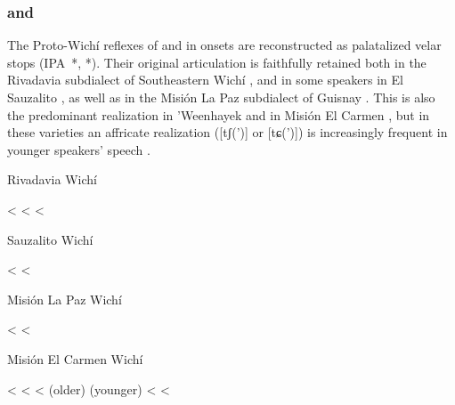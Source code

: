 \subsubsection{ and }

The Proto-Wichí reflexes of  and  in onsets are reconstructed as palatalized velar stops (IPA~*, *). Their original articulation is faithfully retained both in the Rivadavia subdialect of Southeastern Wichí , and in some speakers in El Sauzalito , as well as in the Misión La Paz subdialect of Guisnay . This is also the predominant realization in ’Weenhayek and in Misión El Carmen , but in these varieties an affricate realization ([tʃ(’)] or [tɕ(’)]) is increasingly frequent in younger speakers’ speech \citep[14]{KC94}.

\ea\label{wi:kj:riv}
Rivadavia Wichí \citep[36]{JT09-th}\\
    \begin{xlist}
        \ex {} < 
        \ex {} < 
        \ex {} < 
    \end{xlist}
\z

\ea\label{wi:kj:elsauz}
Sauzalito Wichí \citep[132]{MC09}\\
    \begin{xlist}
        \ex {} < 
        \ex {} < 
    \end{xlist}
\z

\ea\label{wi:kj:mlp}
Misión La Paz Wichí \citep[44–45]{MA08}\\
    \begin{xlist}
        \ex {} < 
        \ex {} < 
    \end{xlist}
\z

\ea\label{wi:kj:mec}
Misión El Carmen Wichí \citep[131–132, 138]{MC09}\\
    \begin{xlist}
        \ex {} < 
        \ex {} < 
        \ex {} < 
        \ex {} (older) \recind {} (younger) < 
        \ex {} < 
    \end{xlist}
\z
{}

